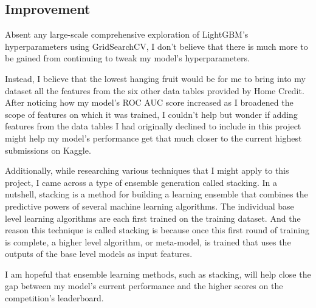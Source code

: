 \documentclass[12pt, letterpaper]{article}
\begin{document}
\subsection{Improvement}
Absent any large-scale comprehensive exploration of LightGBM's hyperparameters using GridSearchCV, I don't believe that there is much more to be gained from continuing to tweak my model's hyperparameters.

Instead, I believe that the lowest hanging fruit would be for me to bring into my dataset all the features from the six other data tables provided by Home Credit. After noticing how my model's ROC AUC score increased as I broadened the scope of features on which it was trained, I couldn't help but wonder if adding features from the data tables I had originally declined to include in this project might help my model's performance get that much closer to the current highest submissions on Kaggle.

Additionally, while researching various techniques that I might apply to this project, I came across a type of ensemble generation called stacking. In a nutshell, stacking is a method for building a learning ensemble that combines the predictive powers of several machine learning algorithms. The individual base level learning algorithms are each first trained on the training dataset. And the reason this technique is called stacking is because once this first round of training is complete, a higher level algorithm, or meta-model, is trained that uses the outputs of the base level models as input features.\cite{statsandbots}

I am hopeful that ensemble learning methods, such as stacking, will help close the gap between my model's current performance and the higher scores on the competition's leaderboard.
\end{document}
